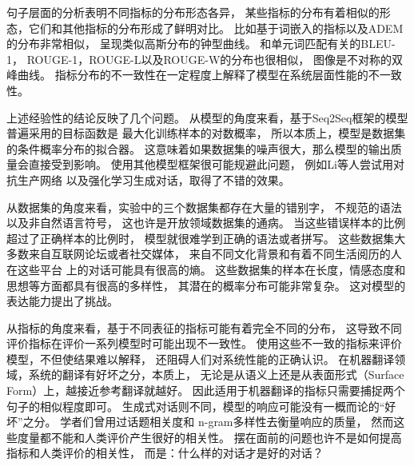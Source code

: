 句子层面的分析表明不同指标的分布形态各异，
某些指标的分布有着相似的形态，它们和其他指标的分布形成了鲜明对比。
比如基于词嵌入的指标以及ADEM的分布非常相似，
呈现类似高斯分布的钟型曲线。
和单元词匹配有关的BLEU-1，
ROUGE-1，ROUGE-L以及ROUGE-W的分布也很相似，
图像是不对称的双峰曲线。
指标分布的不一致性在一定程度上解释了模型在系统层面性能的不一致性。

上述经验性的结论反映了几个问题。
从模型的角度来看，基于Seq2Seq框架的模型普遍采用的目标函数是
最大化训练样本的对数概率，
所以本质上，模型是数据集的条件概率分布的拟合器。
这意味着如果数据集的噪声很大，那么模型的输出质量会直接受到影响。
使用其他模型框架很可能规避此问题，
例如Li等人尝试用对抗生产网络
以及强化学习生成对话，取得了不错的效果。

从数据集的角度来看，实验中的三个数据集都存在大量的错别字，
不规范的语法以及非自然语言符号，
这也许是开放领域数据集的通病。
当这些错误样本的比例超过了正确样本的比例时，
模型就很难学到正确的语法或者拼写。
这些数据集大多数来自互联网论坛或者社交媒体，
来自不同文化背景和有着不同生活阅历的人在这些平台
上的对话可能具有很高的熵。
这些数据集的样本在长度，情感态度和思想等方面都具有很高的多样性，
其潜在的概率分布可能非常复杂。
这对模型的表达能力提出了挑战。

从指标的角度来看，基于不同表征的指标可能有着完全不同的分布，
这导致不同评价指标在评价一系列模型时可能出现不一致性。
使用这些不一致的指标来评价模型，不但使结果难以解释，
还阻碍人们对系统性能的正确认识。
在机器翻译领域，系统的翻译有好坏之分，本质上，
无论是从语义上还是从表面形式（Surface Form）上，越接近参考翻译就越好。
因此适用于机器翻译的指标只需要捕捉两个句子的相似程度即可。
生成式对话则不同，模型的响应可能没有一概而论的“好坏”之分。
学者们曾用过话题相关度和
n-gram多样性去衡量响应的质量，
然而这些度量都不能和人类评价产生很好的相关性。
摆在面前的问题也许不是如何提高指标和人类评价的相关性，
而是：什么样的对话才是好的对话？
